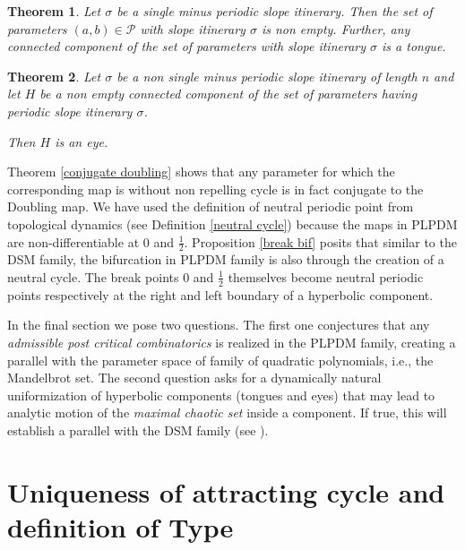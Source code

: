 \documentclass[12pt]{amsart}
\numberwithin{equation}{section}
\newtheorem{theorem}{Theorem}[section]
\theoremstyle{remark}
\begin{document}
\begin{theorem}\label{tongue esist}
    Let $\sigma$ be a single minus periodic slope itinerary. Then the set of parameters $(a,b) \in \mathcal{P}$ with slope itinerary $\sigma$ is non empty. Further, any connected component of  the set of parameters with slope itinerary $\sigma$ is a tongue.
\end{theorem}

\begin{theorem}\label{eye combinatorics}
    Let $\sigma$ be a non single minus periodic slope itinerary of length $n$ and let $H$ be a non empty connected component of the set of parameters having periodic slope itinerary $\sigma$.
 
Then $H$ is an eye. 
\end{theorem}

Theorem \ref{conjugate doubling} shows that any parameter for which the corresponding map is without non repelling cycle is in fact conjugate to the Doubling map. We have used the definition of neutral periodic point from topological dynamics (see Definition \ref{neutral cycle}) because the maps in PLPDM are non-differentiable at $0 $ and $\frac{1}{2}$. Proposition \ref{break bif} posits that similar to the DSM family, the bifurcation in PLPDM family is also through the creation of a neutral cycle. The break points $0$ and $\frac{1}{2}$ themselves become neutral periodic points respectively at the right and left boundary of a hyperbolic component.

In the final section we pose two questions. The first one conjectures that any \textit{admissible post critical combinatorics} is realized  in the PLPDM family, creating a parallel with the parameter space of family of quadratic polynomials, i.e., the Mandelbrot set. The second question asks for a dynamically natural uniformization of hyperbolic components (tongues and eyes) that may lead to  analytic motion of the \textit{maximal chaotic set} inside a component. If true, this will establish a parallel with the DSM family (see \cite{BBM}). 








\section{Uniqueness of  attracting cycle and definition of Type}
\end{document}
